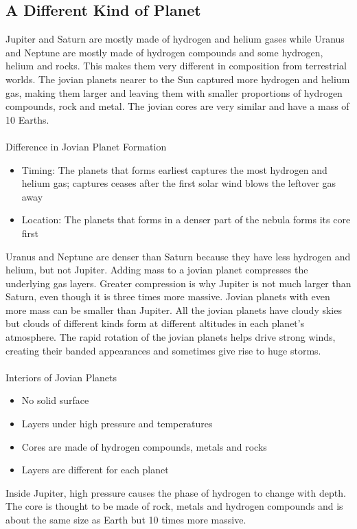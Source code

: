 \documentclass[12pt]{article}
\begin{document}
\subsection{A Different Kind of Planet} 
Jupiter and Saturn are mostly made of hydrogen and helium gases while Uranus and Neptune are mostly made of hydrogen compounds and some hydrogen, helium and rocks. This makes them very different in composition from terrestrial worlds. The jovian planets nearer to the Sun captured more hydrogen and helium gas, making them larger and leaving them with smaller proportions of hydrogen compounds, rock and metal. The jovian cores are very similar and have a mass of 10 Earths. \\~\\
Difference in Jovian Planet Formation \begin{itemize} 
\item Timing: The planets that forms earliest captures the most hydrogen and helium gas; captures ceases after the first solar wind blows the leftover gas away 
\item Location: The planets that forms in a denser part of the nebula forms its core first \end{itemize} \newpage
Uranus and Neptune are denser than Saturn because they have less hydrogen and helium, but not Jupiter. Adding mass to a jovian planet compresses the underlying gas layers. Greater compression is why Jupiter is not much larger than Saturn, even though it is three times more massive. Jovian planets with even more mass can be smaller than Jupiter. All the jovian planets have cloudy skies but clouds of different kinds form at different altitudes in each planet's atmosphere. The rapid rotation of the jovian planets helps drive strong winds, creating their banded appearances and sometimes give rise to huge storms. \\~\\
Interiors of Jovian Planets \begin{itemize} 
\item No solid surface 
\item Layers under high pressure and temperatures 
\item Cores are made of hydrogen compounds, metals and rocks 
\item Layers are different for each planet \end{itemize} 
Inside Jupiter, high pressure causes the phase of hydrogen to change with depth. The core is thought to be made of rock, metals and hydrogen compounds and is about the same size as Earth but 10 times more massive. \\~\\ 
\end{document}
